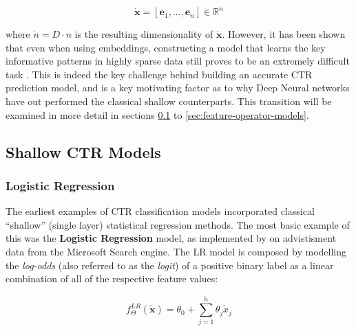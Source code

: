 \documentclass{mldsmsc}
\begin{document}
\begin{equation}
    \dot{\mathbf{x}} = \left[ \mathbf{e}_1, \dots , \mathbf{e}_n\right]
    \in \mathbb{R}^{\dot{n}}
\end{equation}

where $\dot{n} = D\cdot n$
is the resulting dimensionality of $\dot{\mathbf{x}}$. However, it has been shown that
even when using embeddings, constructing a model that learns the key informative patterns
in highly sparse data still proves to be an extremely difficult task \citep{RefWorks:gu2021ad,RefWorks:zhang2021deep}.
This is indeed the key challenge behind building an
accurate CTR prediction model, and is a key motivating factor as to why Deep Neural
networks have out performed the classical shallow counterparts. This transition will be examined
in more detail in sections \ref{sec:shallow-models} to \ref{sec:feature-operator-models}.

\subsection{Shallow CTR Models}
\label{sec:shallow-models}

\subsubsection{Logistic Regression}

The earliest examples of CTR classification models incorporated classical ``shallow'' 
(single layer) statistical regression methods. The most basic example of this was 
the \textbf{Logistic Regression} model, as implemented by \cite{RefWorks:richardson2007predicting} on
advistisment data from the Microsoft Search engine. The LR model
is composed by modelling the \emph{log-odds} (also referred to as the \emph{logit}) 
of a positive binary label as a linear combination
of all of the respective feature values:

\begin{equation}
\label{eqn:lr-model}
f_{\Theta}^{LR}(\tilde{\mathbf{x}}) = \theta_0 + \sum_{j=1}^{\tilde{n}}\theta_j \tilde{x}_j
\end{equation}
\end{document}
